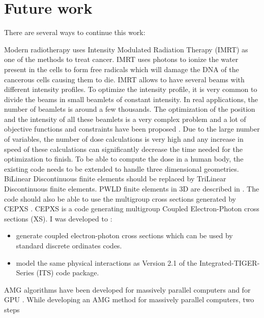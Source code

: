 \section{Future work}
There are several ways to continue this work:
\begin{long_description}
  \item[Extension for medical applications:] Modern radiotherapy uses Intensity 
    Modulated Radiation Therapy (IMRT) as one of the methods to
    treat cancer. IMRT uses photons to ionize the water present in the cells
    to form free radicals which will damage the DNA of the
    cancerous cells causing them to die. IMRT allows to have several beams with 
    different intensity  profiles. To optimize the intensity profile, it is 
    very common to divide the beams in small beamlets of constant intensity. 
    In real applications, the number of beamlets is around a few thousands. 
    The optimization of the position and the intensity of all these beamlets
    is a very complex problem and a lot of objective functions and 
    constraints have been proposed \cite{minima,dose-volume,complexity,math}.
    Due to the large number of variables, the number of dose calculations is
    very high and any increase in speed of these calculations can significantly 
    decrease the time needed for the optimization to finish.
    To be able to compute the dose in a human body, the existing code needs 
    to be extended to handle three dimensional geometries. BiLinear 
    Discontinuous finite elements should be replaced by TriLinear Discontinuous 
    finite elements. PWLD finite elements in 3D are described in \cite{pwld_3d}. 
    The code should also be able to use the multigroup cross sections generated by 
    CEPXS \cite{cepxs}. CEPXS is a code generating multigroup Coupled 
    Electron-Photon cross sections (XS). I was developed to \cite{cepxs}:
    \begin{itemize}
      \item generate coupled electron-photon cross sections which can be used by
        standard discrete ordinates codes.
      \item model the same physical interactions as Version 2.1 of the
        Integrated-TIGER-Series (ITS) code package.
    \end{itemize}
  \item[AMG for DSA on massively parallel computers:] AMG algorithms have been 
    developed for massively parallel
    computers \cite{amg_multicore,amg_parallel} and for GPU \cite{nvidia}.
    While developing an AMG method for massively parallel computers, two steps

\end{long_description}
